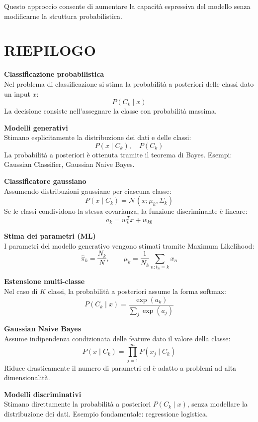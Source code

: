 \documentclass[a4paper,12pt]{report}
\begin{document}
Questo approccio consente di aumentare la capacità espressiva del modello senza modificarne la struttura probabilistica.

\newpage
\section{RIEPILOGO}

\begin{tcolorbox}[
    colback=green!10,
    colframe=green!50!black,
    boxrule=0.4pt,
    left=6pt,
    right=6pt,
    top=6pt,
    bottom=6pt,
    breakable
]

\textbf{Classificazione probabilistica}  \\
Nel problema di classificazione si stima la probabilità a posteriori delle classi dato un input \(x\):
\[
P(C_k \mid x)
\]
La decisione consiste nell’assegnare la classe con probabilità massima.

\medskip
\textbf{Modelli generativi}  \\
Stimano esplicitamente la distribuzione dei dati e delle classi:
\[
P(x \mid C_k), \quad P(C_k)
\]
La probabilità a posteriori è ottenuta tramite il teorema di Bayes.
Esempi: Gaussian Classifier, Gaussian Naive Bayes.

\medskip
\textbf{Classificatore gaussiano}  \\
Assumendo distribuzioni gaussiane per ciascuna classe:
\[
P(x \mid C_k) = \mathcal{N}(x;\mu_k,\Sigma_k)
\]
Se le classi condividono la stessa covarianza, la funzione discriminante è lineare:
\[
a_k = w_k^T x + w_{k0}
\]

\medskip
\textbf{Stima dei parametri (ML)}  \\
I parametri del modello generativo vengono stimati tramite Maximum Likelihood:
\[
\hat{\pi}_k = \frac{N_k}{N}, \qquad
\hat{\mu}_k = \frac{1}{N_k}\sum_{n:t_n=k} x_n
\]

\medskip
\textbf{Estensione multi-classe}  \\
Nel caso di \(K\) classi, la probabilità a posteriori assume la forma softmax:
\[
P(C_k \mid x) = \frac{\exp(a_k)}{\sum_j \exp(a_j)}
\]

\medskip
\textbf{Gaussian Naive Bayes}  \\
Assume indipendenza condizionata delle feature dato il valore della classe:
\[
P(x \mid C_k) = \prod_{j=1}^{m} P(x_j \mid C_k)
\]
Riduce drasticamente il numero di parametri ed è adatto a problemi ad alta dimensionalità.

\medskip
\textbf{Modelli discriminativi}  \\
Stimano direttamente la probabilità a posteriori \(P(C_k \mid x)\), senza modellare la distribuzione dei dati.
Esempio fondamentale: regressione logistica.


\end{tcolorbox}
\end{document}

